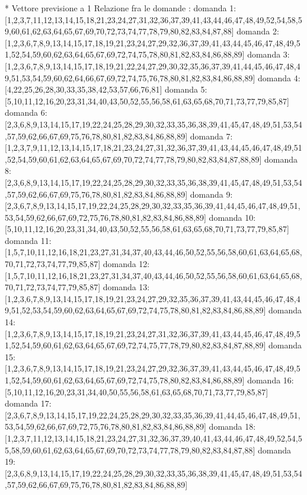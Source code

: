 * Vettore previsione a 1
Relazione fra le domande :
domanda 1:[1,2,3,7,11,12,13,14,15,18,21,23,24,27,31,32,36,37,39,41,43,44,46,47,48,49,52,54,58,59,60,61,62,63,64,65,67,69,70,72,73,74,77,78,79,80,82,83,84,87,88]
domanda 2:[1,2,3,6,7,8,9,13,14,15,17,18,19,21,23,24,27,29,32,36,37,39,41,43,44,45,46,47,48,49,51,52,54,59,60,62,63,64,65,67,69,72,74,75,78,80,81,82,83,84,86,88,89]
domanda 3:[1,2,3,6,7,8,9,13,14,15,17,18,19,21,22,24,27,29,30,32,35,36,37,39,41,44,45,46,47,48,49,51,53,54,59,60,62,64,66,67,69,72,74,75,76,78,80,81,82,83,84,86,88,89]
domanda 4:[4,22,25,26,28,30,33,35,38,42,53,57,66,76,81]
domanda 5:[5,10,11,12,16,20,23,31,34,40,43,50,52,55,56,58,61,63,65,68,70,71,73,77,79,85,87]
domanda 6:[2,3,6,8,9,13,14,15,17,19,22,24,25,28,29,30,32,33,35,36,38,39,41,45,47,48,49,51,53,54,57,59,62,66,67,69,75,76,78,80,81,82,83,84,86,88,89]
domanda 7:[1,2,3,7,9,11,12,13,14,15,17,18,21,23,24,27,31,32,36,37,39,41,43,44,45,46,47,48,49,51,52,54,59,60,61,62,63,64,65,67,69,70,72,74,77,78,79,80,82,83,84,87,88,89]
domanda 8:[2,3,6,8,9,13,14,15,17,19,22,24,25,28,29,30,32,33,35,36,38,39,41,45,47,48,49,51,53,54,57,59,62,66,67,69,75,76,78,80,81,82,83,84,86,88,89]
domanda 9:[2,3,6,7,8,9,13,14,15,17,19,22,24,25,28,29,30,32,33,35,36,39,41,44,45,46,47,48,49,51,53,54,59,62,66,67,69,72,75,76,78,80,81,82,83,84,86,88,89]
domanda 10:[5,10,11,12,16,20,23,31,34,40,43,50,52,55,56,58,61,63,65,68,70,71,73,77,79,85,87]
domanda 11:[1,5,7,10,11,12,16,18,21,23,27,31,34,37,40,43,44,46,50,52,55,56,58,60,61,63,64,65,68,70,71,72,73,74,77,79,85,87]
domanda 12:[1,5,7,10,11,12,16,18,21,23,27,31,34,37,40,43,44,46,50,52,55,56,58,60,61,63,64,65,68,70,71,72,73,74,77,79,85,87]
domanda 13:[1,2,3,6,7,8,9,13,14,15,17,18,19,21,23,24,27,29,32,35,36,37,39,41,43,44,45,46,47,48,49,51,52,53,54,59,60,62,63,64,65,67,69,72,74,75,78,80,81,82,83,84,86,88,89]
domanda 14:[1,2,3,6,7,8,9,13,14,15,17,18,19,21,23,24,27,31,32,36,37,39,41,43,44,45,46,47,48,49,51,52,54,59,60,61,62,63,64,65,67,69,72,74,75,77,78,79,80,82,83,84,87,88,89]
domanda 15:[1,2,3,6,7,8,9,13,14,15,17,18,19,21,23,24,27,29,32,36,37,39,41,43,44,45,46,47,48,49,51,52,54,59,60,61,62,63,64,65,67,69,72,74,75,78,80,82,83,84,86,88,89]
domanda 16:[5,10,11,12,16,20,23,31,34,40,50,55,56,58,61,63,65,68,70,71,73,77,79,85,87]
domanda 17:[2,3,6,7,8,9,13,14,15,17,19,22,24,25,28,29,30,32,33,35,36,39,41,44,45,46,47,48,49,51,53,54,59,62,66,67,69,72,75,76,78,80,81,82,83,84,86,88,89]
domanda 18:[1,2,3,7,11,12,13,14,15,18,21,23,24,27,31,32,36,37,39,40,41,43,44,46,47,48,49,52,54,55,58,59,60,61,62,63,64,65,67,69,70,72,73,74,77,78,79,80,82,83,84,87,88]
domanda 19:[2,3,6,8,9,13,14,15,17,19,22,24,25,28,29,30,32,33,35,36,38,39,41,45,47,48,49,51,53,54,57,59,62,66,67,69,75,76,78,80,81,82,83,84,86,88,89]
